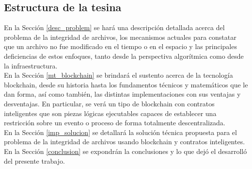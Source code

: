 \subsection{Estructura de la tesina}

En la Sección \ref{desc_problem} se hará una descripción detallada acerca del problema de la integridad de archivos, los mecanismos actuales para constatar que un archivo no fue modificado en el tiempo o en el espacio y las principales deficiencias de estos enfoques, tanto desde la perspectiva algorítmica como desde la infraestructura.
\\

En la Sección \ref{mt_blockchain} se brindará el sustento acerca de la tecnología blockchain, desde su historia hasta los fundamentos técnicos y matemáticos que le dan forma, así como también, las distintas implementaciones con sus ventajas y desventajas. En particular, se verá un tipo de blockchain con contratos inteligentes que son piezas lógicas ejecutables capaces de establecer una restricción sobre un evento o proceso de forma totalmente descentralizada.
\\

En la Sección \ref{imp_solucion} se detallará la solución técnica propuesta para el problema de la integridad de archivos usando blockchain y contratos inteligentes.
\\

En la Sección \ref{conclusion} se expondrán la conclusiones y lo que dejó el desarrolló del presente trabajo.

